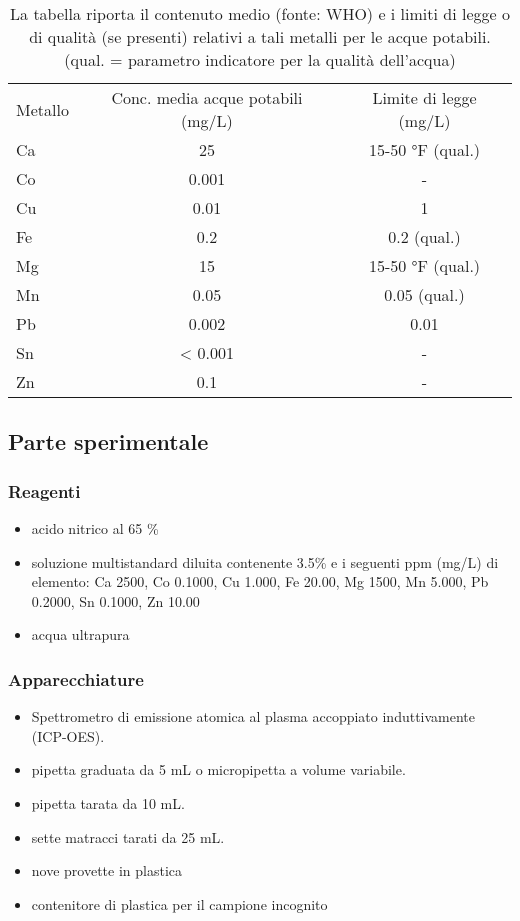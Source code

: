 \begin{table}
\begin{tabular}{lcc}
Metallo & Conc. media acque potabili (mg/L) & Limite di legge (mg/L)\\
Ca & 25 & 15-50 °F (qual.)\\
Co & 0.001 & -\\
Cu & 0.01 & 1\\
Fe & 0.2 & 0.2 (qual.)\\
Mg & 15 & 15-50 °F (qual.)\\
Mn & 0.05 & 0.05 (qual.)\\
Pb & 0.002 & 0.01\\
Sn & < 0.001 & -\\
Zn & 0.1 & -\\
\end{tabular}
\caption{La tabella riporta il contenuto medio (fonte: WHO) e i limiti di legge o di qualità (se presenti) relativi a tali metalli per le acque potabili. (qual. = parametro indicatore per la qualità dell'acqua)}
\end{table}

\subsection{Parte sperimentale}

\subsubsection{Reagenti}
\begin{itemize}
\item acido nitrico al 65 \%
\item soluzione multistandard diluita contenente  3.5\% e i seguenti ppm (mg/L) di elemento: Ca 2500, Co 0.1000, Cu 1.000, Fe 20.00, Mg 1500, Mn 5.000, Pb 0.2000, Sn 0.1000, Zn 10.00
\item acqua ultrapura
\end{itemize}

\subsubsection{Apparecchiature}
\begin{itemize}
\item Spettrometro di emissione atomica al plasma accoppiato induttivamente (ICP-OES).
\item pipetta graduata da 5 mL o micropipetta a volume variabile.
\item pipetta tarata da 10 mL.
\item sette matracci tarati da 25 mL.
\item nove provette in plastica
\item contenitore di plastica per il campione incognito
\end{itemize}

